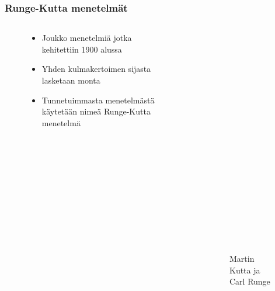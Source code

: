 \documentclass[finnish, 11pt, fleqn]{beamer}
\begin{document}
\begin{frame}
	\frametitle{Runge-Kutta menetelmät}
	\begin{columns}[onlytextwidth]
		\begin{column}{.5\textwidth}
			\begin{figure}
				\vspace{-2em}
    			\begin{itemize}
    				\item{\small Joukko menetelmiä jotka kehitettiin 1900 alussa}
    				\vspace{1em}
    				\item{\small Yhden kulmakertoimen sijasta lasketaan monta}
    				\vspace{1em}
    				\item{\small Tunnetuimmasta menetelmästä käytetään nimeä Runge-Kutta menetelmä}
    			\end{itemize}
			\end{figure}
		\end{column}
		\hfill
		\begin{column}{.45\textwidth}
			\begin{figure}[t!]
    			\centering
    			\begin{subfigure}[t]{0.5\textwidth}
        			\centering
        			\includegraphics[height=1.6in]{graphics/Martin_Wilhelm_Kutta.jpg}
    			\end{subfigure}%
    			~
    			\begin{subfigure}[t]{0.5\textwidth}
        			\centering
        			\includegraphics[height=1.6in]{graphics/Karl_Runge.jpg}
    			\end{subfigure}
    			\caption{Martin Kutta ja Carl Runge}
			\end{figure}
		\end{column}
	\end{columns}	
\end{frame}
\end{document}
